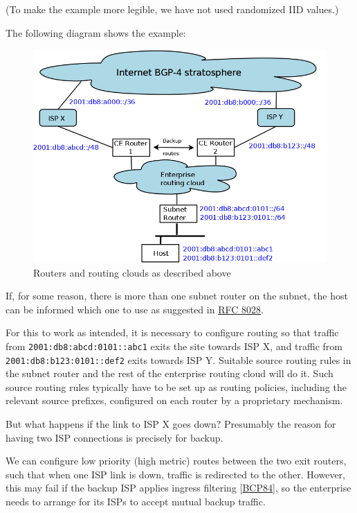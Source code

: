 \documentclass[
]{article}
\begin{document}
(To make the example more legible, we have not used randomized IID
values.)

The following diagram shows the example:

\begin{figure}
\centering
\includegraphics{multiPrefix.png}
\caption{Routers and routing clouds as described above}
\end{figure}

If, for some reason, there is more than one subnet router on the subnet,
the host can be informed which one to use as suggested in
\href{https://www.rfc-editor.org/info/rfc8028}{RFC 8028}.

For this to work as intended, it is necessary to configure routing so
that traffic from \texttt{2001:db8:abcd:0101::abc1} exits the site
towards ISP X, and traffic from \texttt{2001:db8:b123:0101::def2} exits
towards ISP Y. Suitable source routing rules in the subnet router and
the rest of the enterprise routing cloud will do it. Such source routing
rules typically have to be set up as routing policies, including the
relevant source prefixes, configured on each router by a proprietary
mechanism.

But what happens if the link to ISP X goes down? Presumably the reason
for having two ISP connections is precisely for backup.

We can configure low priority (high metric) routes between the two exit
routers, such that when one ISP link is down, traffic is redirected to
the other. However, this may fail if the backup ISP applies ingress
filtering {[}\href{https://www.rfc-editor.org/info/bcp84}{BCP84}{]}, so
the enterprise needs to arrange for its ISPs to accept mutual backup
traffic.
\end{document}
